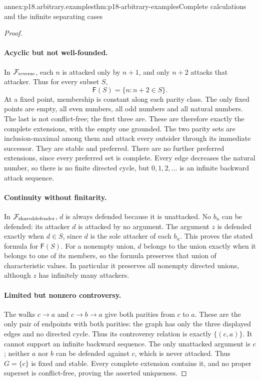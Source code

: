 \begin{annexitem}{annex:p18.arbitrary.examples}{thm:p18-arbitrary-examples}{Complete calculations and the infinite separating cases}
\begin{proof}
\paragraph{Acyclic but not well-founded.}
In \(\mathcal F_{\rm reverse}\),
each \(n\) is attacked
only by \(n+1\), and
only \(n+2\) attacks
that attacker. Thus for
every subset \(S\),
\[
                       \mathsf F(S)=\{n:n+2\in S\}.
\]
At a fixed point, membership
is constant along each
parity class. The only
fixed points are empty,
all even numbers, all
odd numbers and all
natural numbers. The
last is not conflict-free;
the first three are.
These are therefore
exactly the complete
extensions, with the
empty one grounded.
The two parity sets
are inclusion-maximal
among them and attack
every outsider through
its immediate successor.
They are stable and
preferred. There are
no further preferred
extensions, since every
preferred set is complete.
Every edge decreases
the natural number,
so there is no finite
directed cycle, but
\(0,1,2,\ldots\) is
an infinite backward
attack sequence.

\paragraph{Continuity without finitarity.}
In \(\mathcal F_{\rm shareddefender}\),
\(d\) is always defended
because it is unattacked.
No \(b_n\) can be defended:
its attacker \(d\) is
attacked by no argument.
The argument \(z\) is
defended exactly when
\(d\in S\), since \(d\)
is the sole attacker
of each \(b_n\).
This proves the stated
formula for \(\mathsf F(S)\).
For a nonempty union,
\(d\) belongs to the
union exactly when it
belongs to one of its
members, so the formula
preserves that union
of characteristic values.
In particular it preserves
all nonempty directed
unions, although \(z\)
has infinitely many
attackers.

\paragraph{Limited but nonzero controversy.}
The walks \(c\to a\)
and \(c\to b\to a\)
give both parities
from \(c\) to \(a\).
These are the only
pair of endpoints
with both parities:
the graph has only
the three displayed
edges and no directed
cycle. Thus its
controversy relation
is exactly \(\{(c,a)\}\).
It cannot support
an infinite backward
sequence. The only
unattacked argument is
\(c\); neither \(a\)
nor \(b\) can be
defended against \(c\),
which is never attacked.
Thus \(G=\{c\}\) is
fixed and stable.
Every complete extension
contains it, and no
proper superset is
conflict-free, proving
the asserted uniqueness.


\end{proof}
\end{annexitem}
